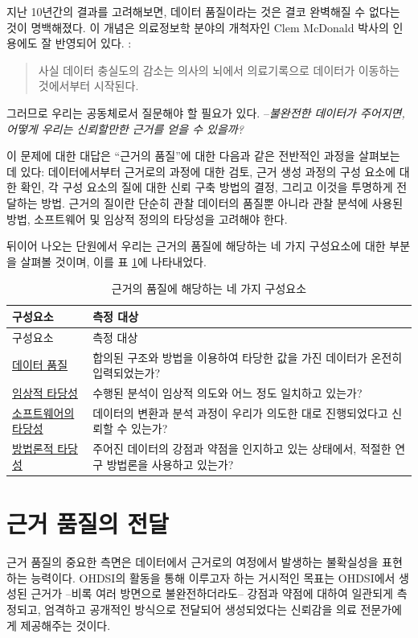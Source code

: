 \documentclass[10.5pt]{book}
\theoremstyle{definition}
\theoremstyle{definition}
\theoremstyle{definition}
\theoremstyle{remark}
\begin{document}
지난 10년간의 결과를 고려해보면, 데이터 품질이라는 것은 결코 완벽해질 수
없다는 것이 명백해졌다. 이 개념은 의료정보학 분야의 개척자인 Clem
McDonald 박사의 인용에도 잘 반영되어 있다. :

\begin{quote}
사실 데이터 충실도의 감소는 의사의 뇌에서 의료기록으로 데이터가 이동하는
것에서부터 시작된다. 
\end{quote}

그러므로 우리는 공동체로서 질문해야 할 필요가 있다. --\emph{불완전한
데이터가 주어지면, 어떻게 우리는 신뢰할만한 근거를 얻을 수 있을까?}

이 문제에 대한 대답은 ``근거의 품질''에 대한 다음과 같은 전반적인 과정을
살펴보는 데 있다: 데이터에서부터 근거로의 과정에 대한 검토, 근거 생성
과정의 구성 요소에 대한 확인, 각 구성 요소의 질에 대한 신뢰 구축 방법의
결정, 그리고 이것을 투명하게 전달하는 방법. 근거의 질이란 단순히 관찰
데이터의 품질뿐 아니라 관찰 분석에 사용된 방법, 소프트웨어 및 임상적
정의의 타당성을 고려해야 한다. 

뒤이어 나오는 단원에서 우리는 근거의 품질에 해당하는 네 가지 구성요소에
대한 부분을 살펴볼 것이며, 이를 표 \ref{tab:evidenceQuality}에
나타내었다.

\begin{longtable}[]{@{}ll@{}}
\caption{\label{tab:evidenceQuality} 근거의 품질에 해당하는 네 가지
구성요소}\tabularnewline
\toprule
구성요소 & 측정 대상\tabularnewline
\midrule
\endfirsthead
\toprule
구성요소 & 측정 대상\tabularnewline
\midrule
\endhead
\href{DataQuality.html}{데이터 품질} & 합의된 구조와 방법을 이용하여
타당한 값을 가진 데이터가 온전히 입력되었는가?\tabularnewline
\href{ClinicalValidity.html}{임상적 타당성} & 수행된 분석이 임상적
의도와 어느 정도 일치하고 있는가?\tabularnewline
\href{SoftwareValidity.html}{소프트웨어의 타당성} & 데이터의 변환과 분석
과정이 우리가 의도한 대로 진행되었다고 신뢰할 수 있는가?\tabularnewline
\href{MethodValidity.html}{방법론적 타당성} & 주어진 데이터의 강점과
약점을 인지하고 있는 상태에서, 적절한 연구 방법론을 사용하고
있는가?\tabularnewline
\bottomrule
\end{longtable}

\section{근거 품질의 전달}\label{--}

근거 품질의 중요한 측면은 데이터에서 근거로의 여정에서 발생하는
불확실성을 표현하는 능력이다. OHDSI의 활동을 통해 이루고자 하는 거시적인
목표는 OHDSI에서 생성된 근거가 --비록 여러 방면으로 불완전하더라도--
강점과 약점에 대하여 일관되게 측정되고, 엄격하고 공개적인 방식으로
전달되어 생성되었다는 신뢰감을 의료 전문가에게 제공해주는 것이다.
\end{document}
